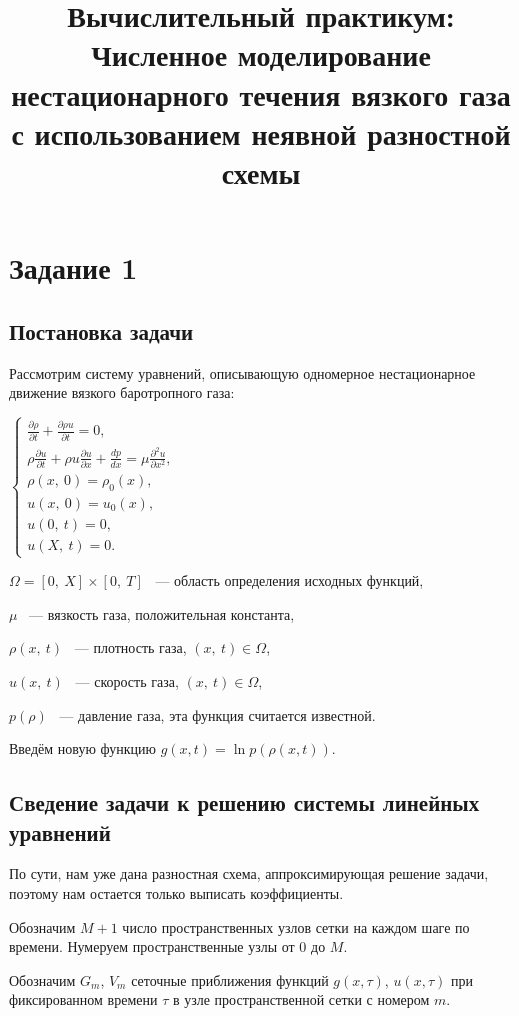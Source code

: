 \documentclass[12pt]{article}
\title{Вычислительный практикум: Численное моделирование нестационарного течения вязкого газа
с использованием неявной разностной схемы}
\begin{document}
\maketitle
\section{Задание 1}
\subsection{Постановка задачи}
Рассмотрим систему уравнений, описывающую одномерное нестационарное движение вязкого баротропного газа:

$
\begin{cases}
	\frac{\partial\rho}{\partial t} + \frac{\partial\rho u}{\partial t} = 0{,}\\
	\rho\frac{\partial u}{\partial t} + \rho u \frac{\partial u}{\partial x} + \frac{dp}{dx} = \mu \frac{\partial^2 u}{\partial x^2}{,}\\
	\rho(x{,} \:0) = \rho_0 (x),\\
	u(x{,} \:0) = u_0 (x),\\
	u(0, \:t) = 0,\\
	u (X, \:t) = 0.
\end{cases}
$

$\Omega =\left[0{,} \:X\right] \times\left[0{,} \:T\right]$ ~--- область определения исходных функций,

$\mu$ ~--- вязкость газа, положительная константа,

$\rho (x{,} \:t)$ ~--- плотность газа, $(x{,} \:t) \in \Omega$,

 $u (x{,}\: t)$ ~--- скорость газа, $(x{,}\: t) \in \Omega$,
 
 $p(\rho)$ ~--- давление газа, эта функция считается известной. 
 
Введём новую функцию $g\left(x{,} t\right) = \ln p\left(\rho\left(x{,} t\right)\right)$. 
\subsection{Сведение задачи к решению системы линейных уравнений}
По сути, нам уже дана разностная схема, аппроксимирующая решение задачи, поэтому нам остается только выписать коэффициенты.

Обозначим $M + 1$ число пространственных узлов сетки на каждом шаге по времени. Нумеруем пространственные узлы от 0 до $M$.

Обозначим $G_m$, $V_m$ сеточные приближения функций $g(x, \tau)$, $u(x, \tau)$ при фиксированном времени $\tau$ в узле пространственной сетки с номером $m$.
\end{document}
